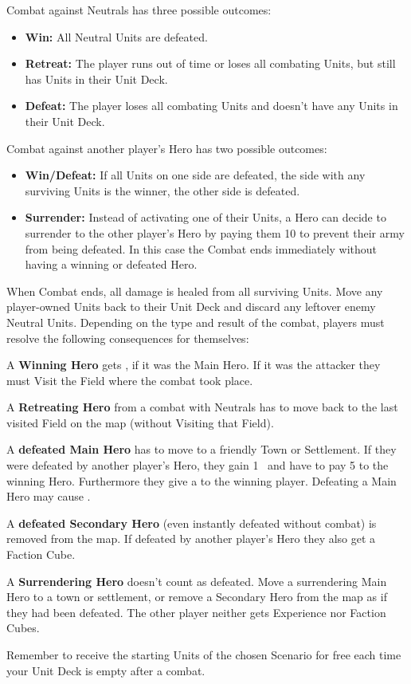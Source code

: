 \begin{multicols*}{2}
Combat against Neutrals has three possible outcomes:
\begin{itemize}
  \item \textbf{Win:} All Neutral Units are defeated.
  \item \textbf{Retreat:} The player runs out of time or loses all combating Units, but still has Units in their Unit Deck.
  \item \textbf{Defeat:} The player loses all combating Units and doesn't have any Units in their Unit Deck.
\end{itemize}

Combat against another player's Hero has two possible outcomes:
\begin{itemize}
 \item \textbf{Win/Defeat:} If all Units on one side are defeated, the side with any surviving Units is the winner, the other side is defeated.
 \item \textbf{Surrender:} Instead of activating one of their Units, a Hero can decide to surrender to the other player's Hero by paying them 10  to prevent their army from being defeated. In this case the Combat ends immediately without having a winning or defeated Hero.
\end{itemize}

When Combat ends, all damage is healed from all surviving Units. Move any player-owned Units back to their Unit Deck and discard any leftover enemy Neutral Units. Depending on the type and result of the combat, players must resolve the following consequences for themselves:

A \textbf{Winning Hero} gets , if it was the Main Hero. If it was the attacker they must Visit the Field where the combat took place.\par
A \textbf{Retreating Hero} from a combat with Neutrals has to move back to the last visited Field on the map (without Visiting that Field).\par
\columnbreak
A \textbf{defeated Main Hero} has to move to a friendly Town or Settlement. If they were defeated by another player's Hero, they gain 1~ and have to pay 5  to the winning Hero. Furthermore they give a  to the winning player. Defeating a Main Hero may cause .\par
A \textbf{defeated Secondary Hero} (even instantly defeated without combat) is removed from the map. If defeated by another player's Hero they also get a Faction Cube.\par
A \textbf{Surrendering Hero} doesn't count as defeated. Move a surrendering Main Hero to a town or settlement, or remove a Secondary Hero from the map as if they had been defeated. The other player neither gets Experience nor Faction Cubes.\par
Remember to receive the starting Units of the chosen Scenario for free each time your Unit Deck is empty after a combat.


\end{multicols*}
